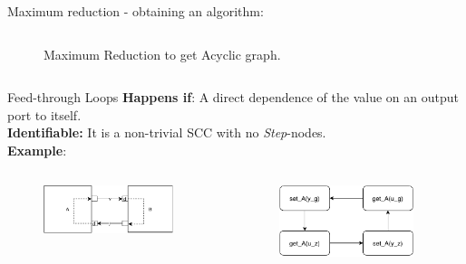 \documentclass{beamer}
\begin{document}
\begin{frame}{Maximum reduction - obtaining an algorithm:}
\begin{columns}[T]
\begin{column}{.48\textwidth}
\begin{figure}
            \caption{Maximum Reduction to get Acyclic graph.}
        \end{figure}
    \end{column}%
    \end{columns}    
\end{frame}


\begin{frame}{Feed-through Loops}
    \textbf{Happens if}: A direct dependence of the value on an output port to itself.\\
    \textbf{Identifiable:} It is a non-trivial SCC with no \textit{Step}-nodes. \\
    \textbf{Example}: 
    \begin{columns}[T] %
        \begin{column}{.48\textwidth}
            \begin{figure}    
                \includegraphics[width=0.9\textwidth]{images/feedthroughloop.pdf}
            \end{figure}
    \end{column}%
    \hfill%
    \begin{column}{.48\textwidth}
        \begin{figure}    
            \includegraphics[width=0.9\textwidth]{images/feed_loop_dep.pdf}
        \end{figure}
    \end{column}%
    \end{columns}
\end{frame}
\end{document}

